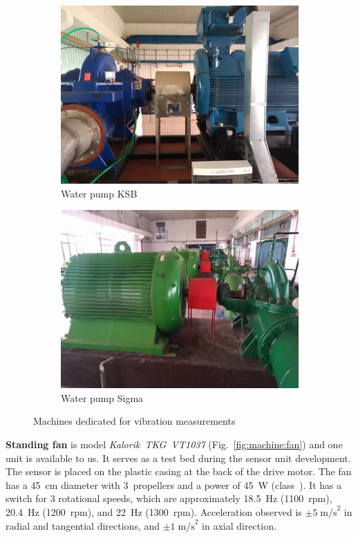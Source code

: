 \begin{figure}[ht]
\begin{subfigure}[b]{0.31\textwidth}
        \includegraphics[width=\textwidth]{assets/design/machine-ksb-pump.jpg}
        \caption{\footnotesize Water pump KSB}
        \label{fig:machine:pump-ksb}
    \end{subfigure}
    \hfill
    \begin{subfigure}[b]{0.31\textwidth}
    		\centering
        \includegraphics[width=\textwidth]{assets/design/machine-sigma-pump.jpg}
        \caption{\footnotesize Water pump Sigma}
        \label{fig:machine:pump-sigma}
    \end{subfigure}
    \caption{Machines dedicated for vibration measurements}
\end{figure}

\textbf{Standing fan} is model \emph{Kalorik~TKG~VT1037} (Fig.~\ref{fig:machine:fan}) and one unit is available to us. It serves as a test bed during the sensor unit development. The sensor is placed on the plastic casing at the back of the drive motor. The fan has a 45~cm diameter with 3~propellers and a power of 45~W (class~). It has a switch for 3 rotational speeds, which are approximately 18.5~Hz (1100~rpm), 20.4~Hz (1200~rpm), and 22~Hz (1300~rpm). Acceleration observed is $\pm 5\;\mathrm{m/s}^2$ in radial and tangential directions, and $\pm 1\;\mathrm{m/s}^2$ in axial direction.

